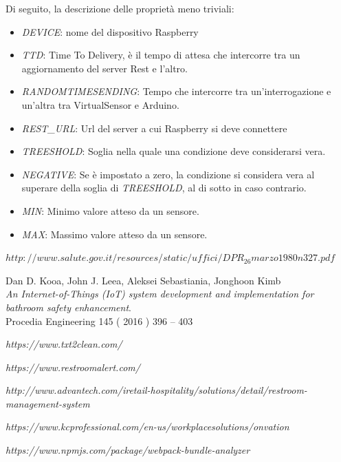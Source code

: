 \documentclass[12pt]{article}
\begin{document}
Di seguito, la descrizione delle proprietà meno triviali:
\begin{itemize}
\item \textit{DEVICE}: nome del dispositivo Raspberry
\item \textit{TTD}: Time To Delivery, è il tempo di attesa che intercorre tra un aggiornamento del server Rest e l'altro.
\item \textit{RANDOMTIMESENDING}: Tempo che intercorre tra un'interrogazione e un'altra tra VirtualSensor e Arduino.
\item \textit{REST\_URL}: Url del server a cui Raspberry si deve connettere
\item \textit{TREESHOLD}: Soglia nella quale una condizione deve considerarsi vera.
\item \textit{NEGATIVE}: Se è impostato a zero, la condizione si considera vera al superare della soglia di \textit{TREESHOLD}, al di sotto in caso contrario.
\item \textit{MIN}: Minimo valore atteso da un sensore.
\item \textit{MAX}: Massimo valore atteso da un sensore.
\end{itemize}
\begin{thebibliography}{9}
\textit{$http://www.salute.gov.it/resources/static/uffici/DPR_26marzo1980n327.pdf$}

Dan D. Kooa, John J. Leea, Aleksei Sebastiania, Jonghoon Kimb \\
\textit{An Internet-of-Things (IoT) system development and
implementation for bathroom safety enhancement}.\\
Procedia Engineering 145 ( 2016 ) 396 – 403 

\textit{https://www.txt2clean.com/}

\textit{https://www.restroomalert.com/}

\textit{http://www.advantech.com/iretail-hospitality/solutions/detail/restroom-management-system}

\textit{https://www.kcprofessional.com/en-us/workplacesolutions/onvation}

\textit{https://www.npmjs.com/package/webpack-bundle-analyzer}

\end{thebibliography}

\end{document}
